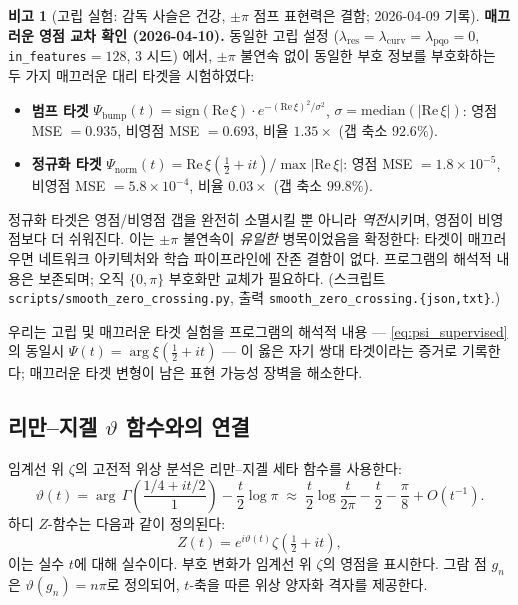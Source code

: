 \documentclass[11pt, a4paper]{article}
\theoremstyle{definition}
\newtheorem{remark}{비고}[section]
\theoremstyle{plain}
\newcommand{\xif}{\xi}
\newcommand{\Psip}{\Psi}
\begin{document}
\begin{remark}[고립 실험: 감독 사슬은 건강, $\pm\pi$ 점프 표현력은 결함; 2026-04-09 기록]
\smallskip
\noindent\textbf{매끄러운 영점 교차 확인 (2026-04-10).}
동일한 고립 설정 ($\lambda_{\mathrm{res}}=\lambda_{\mathrm{curv}}=\lambda_{\mathrm{pqo}}=0$, \texttt{in\_features}$=128$, 3 시드) 에서, $\pm\pi$ 불연속 없이 동일한 부호 정보를 부호화하는 두 가지 매끄러운 대리 타겟을 시험하였다:
\begin{itemize}
  \item \textbf{범프 타겟}
  $\Psi_{\mathrm{bump}}(t) = \mathrm{sign}(\mathrm{Re}\,\xif)
   \cdot e^{-(\mathrm{Re}\,\xif)^2/\sigma^2}$,
  $\sigma=\mathrm{median}(|\mathrm{Re}\,\xif|)$:
  영점 MSE $=0.935$, 비영점 MSE $=0.693$, 비율 $1.35\times$
  (갭 축소 $92.6\%$).
  \item \textbf{정규화 타겟}
  $\Psi_{\mathrm{norm}}(t) = \mathrm{Re}\,\xif(\tfrac{1}{2}+it)
   \big/\max|\mathrm{Re}\,\xif|$:
  영점 MSE $=1.8\times 10^{-5}$, 비영점 MSE $=5.8\times 10^{-4}$,
  비율 $0.03\times$ (갭 축소 $99.8\%$).
\end{itemize}
정규화 타겟은 영점/비영점 갭을 완전히 소멸시킬 뿐 아니라 \emph{역전}시키며, 영점이 비영점보다 더 쉬워진다. 이는 $\pm\pi$ 불연속이 \emph{유일한} 병목이었음을 확정한다: 타겟이 매끄러우면 네트워크 아키텍처와 학습 파이프라인에 잔존 결함이 없다. 프로그램의 해석적 내용은 보존되며; 오직 $\{0,\pi\}$ 부호화만 교체가 필요하다. (스크립트 \texttt{scripts/smooth\_zero\_crossing.py}, 출력 \texttt{smooth\_zero\_crossing.\{json,txt\}}.)

\smallskip
우리는 고립 및 매끄러운 타겟 실험을 프로그램의 해석적 내용 --- \cref{eq:psi_supervised}의 동일시 $\Psip(t)=\arg\xif(\tfrac{1}{2}+it)$ --- 이 옳은 자기 쌍대 타겟이라는 증거로 기록한다; 매끄러운 타겟 변형이 남은 표현 가능성 장벽을 해소한다.
\end{remark}


\subsection{리만--지겔 $\vartheta$ 함수와의 연결}

임계선 위 $\zeta$의 고전적 위상 분석은 리만--지겔 세타 함수를 사용한다:
\begin{equation}
  \vartheta(t) = \arg\,\Gamma\!\left(\frac{1/4 + it/2}{1}\right) -
  \frac{t}{2}\log\pi
  \;\approx\;
  \frac{t}{2}\log\frac{t}{2\pi} - \frac{t}{2} - \frac{\pi}{8} +
  O(t^{-1}).
  \label{eq:riemann_siegel_theta}
\end{equation}
하디 $Z$-함수는 다음과 같이 정의된다:
\begin{equation}
  Z(t) = e^{i\vartheta(t)}\zeta(\tfrac{1}{2}+it),
  \label{eq:hardy_z}
\end{equation}
이는 실수 $t$에 대해 실수이다. 부호 변화가 임계선 위 $\zeta$의 영점을 표시한다. 그람 점 $g_n$은 $\vartheta(g_n) = n\pi$로 정의되어, $t$-축을 따른 위상 양자화 격자를 제공한다.
\end{document}
